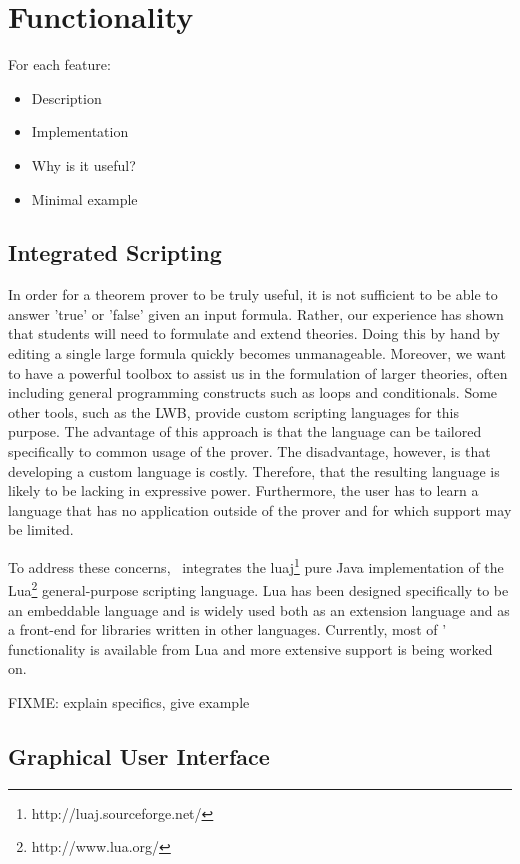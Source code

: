 \section{Functionality}
\label{sec:features}

For each feature:
\begin{itemize}
\item{Description}
\item{Implementation}
\item{Why is it useful?}
\item{Minimal example}
\end{itemize}

\subsection{Integrated Scripting}

In order for a theorem prover to be truly useful, it is not sufficient to be
able to answer 'true' or 'false' given an input formula. Rather, our
experience has shown that students will need to formulate and extend theories.
Doing this by hand by editing a single large formula quickly becomes
unmanageable.
Moreover, we want to have a powerful toolbox to assist us in the formulation
of larger theories, often including general programming constructs such as
loops and conditionals. Some other tools, such as the LWB, provide custom
scripting languages for this purpose. The advantage of this approach is that
the language can be tailored specifically to common usage of the prover. The
disadvantage, however, is that developing a custom language is costly.
Therefore, that the resulting language is likely to be lacking in expressive
power. Furthermore, the user has to learn a language that has no application
outside of the prover and for which support may be limited.

To address these concerns, \oops\ integrates the
luaj\footnote{http://luaj.sourceforge.net/} pure Java implementation of the
Lua\footnote{http://www.lua.org/} general-purpose scripting language. Lua has
been designed specifically to be an embeddable language and is widely used
both as an extension language and as a front-end for libraries written in
other languages. Currently, most of \oops' functionality is available from
Lua and more extensive support is being worked on.

FIXME: explain specifics, give example

\subsection{Graphical User Interface}

